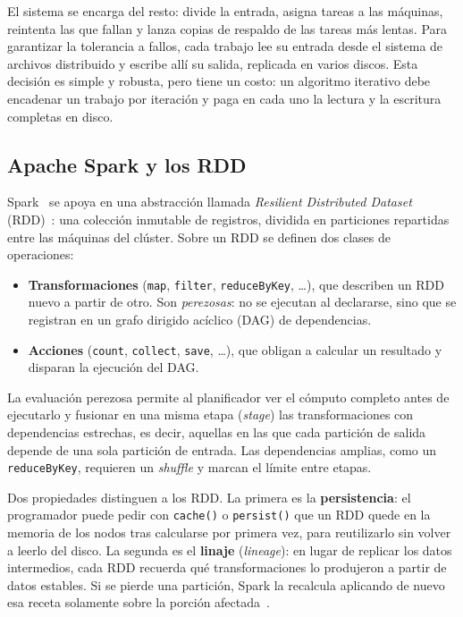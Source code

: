 \documentclass[conference,a4paper]{IEEEtran}
\begin{document}
El sistema se encarga del resto: divide la entrada, asigna tareas a las máquinas, reintenta las que fallan y lanza copias de respaldo de las tareas más lentas. Para garantizar la tolerancia a fallos, cada trabajo lee su entrada desde el sistema de archivos distribuido y escribe allí su salida, replicada en varios discos. Esta decisión es simple y robusta, pero tiene un costo: un algoritmo iterativo debe encadenar un trabajo por iteración y paga en cada uno la lectura y la escritura completas en disco.

\subsection{Apache Spark y los RDD}

Spark~\cite{zaharia2010spark} se apoya en una abstracción llamada \textit{Resilient Distributed Dataset} (RDD)~\cite{zaharia2012rdd}: una colección inmutable de registros, dividida en particiones repartidas entre las máquinas del clúster. Sobre un RDD se definen dos clases de operaciones:

\begin{itemize}
\item \textbf{Transformaciones} (\texttt{map}, \texttt{filter}, \texttt{reduceByKey}, \ldots), que describen un RDD nuevo a partir de otro. Son \textit{perezosas}: no se ejecutan al declararse, sino que se registran en un grafo dirigido acíclico (DAG) de dependencias.
\item \textbf{Acciones} (\texttt{count}, \texttt{collect}, \texttt{save}, \ldots), que obligan a calcular un resultado y disparan la ejecución del DAG.
\end{itemize}

La evaluación perezosa permite al planificador ver el cómputo completo antes de ejecutarlo y fusionar en una misma etapa (\textit{stage}) las transformaciones con dependencias estrechas, es decir, aquellas en las que cada partición de salida depende de una sola partición de entrada. Las dependencias amplias, como un \texttt{reduceByKey}, requieren un \textit{shuffle} y marcan el límite entre etapas.

Dos propiedades distinguen a los RDD. La primera es la \textbf{persistencia}: el programador puede pedir con \texttt{cache()} o \texttt{persist()} que un RDD quede en la memoria de los nodos tras calcularse por primera vez, para reutilizarlo sin volver a leerlo del disco. La segunda es el \textbf{linaje} (\textit{lineage}): en lugar de replicar los datos intermedios, cada RDD recuerda qué transformaciones lo produjeron a partir de datos estables. Si se pierde una partición, Spark la recalcula aplicando de nuevo esa receta solamente sobre la porción afectada~\cite{zaharia2012rdd}.
\end{document}
